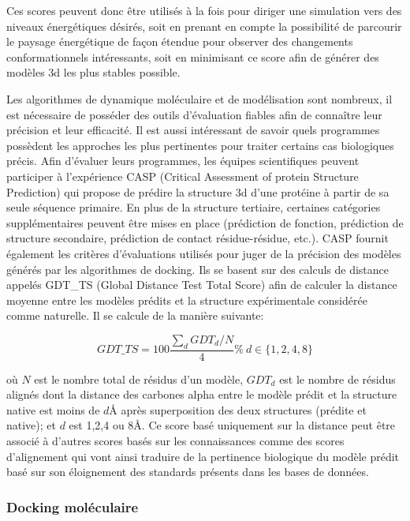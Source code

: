 Ces scores peuvent donc être utilisés à la fois pour diriger une simulation vers des niveaux énergétiques désirés, soit en prenant en compte la possibilité de parcourir le paysage énergétique de façon étendue pour observer des changements conformationnels intéressants, soit en minimisant ce score afin de générer des modèles 3d les plus stables possible.

Les algorithmes de dynamique moléculaire et de modélisation sont nombreux, il est nécessaire de posséder des outils d'évaluation fiables afin de connaître leur précision et leur efficacité. Il est aussi intéressant de savoir quels programmes possèdent les approches les plus pertinentes pour traiter certains cas biologiques précis. Afin d'évaluer leurs programmes, les équipes scientifiques peuvent participer à l'expérience CASP (Critical Assessment of protein Structure Prediction) qui propose de prédire la structure 3d d'une protéine à partir de sa seule séquence primaire. En plus de la structure tertiaire, certaines catégories supplémentaires peuvent être mises en place (prédiction de fonction, prédiction de structure secondaire, prédiction de contact résidue-résidue, etc.). CASP fournit également les critères d'évaluations utilisés pour juger de la précision des modèles générés par les algorithmes de docking. Ils se basent sur des calculs de distance appelés GDT\_TS (Global Distance Test Total Score) afin de calculer la distance moyenne entre les modèles prédits et la structure expérimentale considérée comme naturelle. Il se calcule de la manière suivante:

$$GDT\_TS = 100\frac{\sum_dGDT_d/N}{4}\%\ d\in\{1,2,4,8\}$$

où $N$ est le nombre total de résidus d'un modèle, $GDT_d$ est le nombre de résidus alignés dont la distance des carbones alpha entre le modèle prédit et la structure native est moins de $d$\r{A} après superposition des deux structures (prédite et native); et $d$ est 1,2,4 ou 8\r{A}.
Ce score basé uniquement sur la distance peut être associé à d'autres scores basés sur les connaissances comme des scores d'alignement qui vont ainsi traduire de la pertinence biologique du modèle prédit basé sur son éloignement des standards présents dans les bases de données.

\subsubsection{Docking moléculaire}

